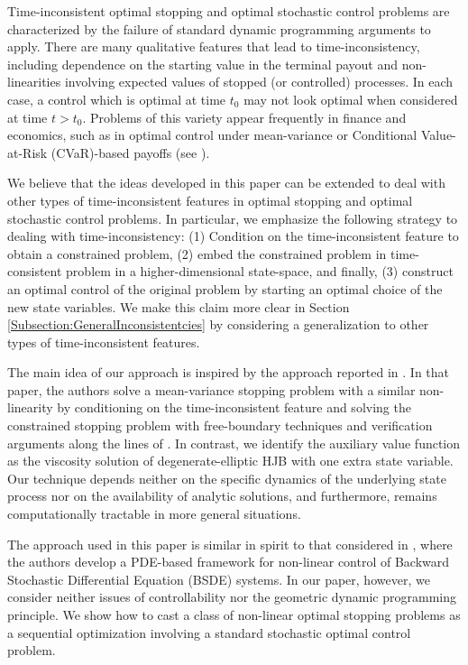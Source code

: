 \documentclass[11pt]{article}
\begin{document}
Time-inconsistent optimal stopping and optimal stochastic control problems are characterized by the failure of standard dynamic programming arguments to apply. There are many qualitative features that lead to time-inconsistency, including dependence on the starting value in the terminal payout and non-linearities involving expected values of stopped (or controlled) processes. In each case, a control which is optimal at time $t_0$ may not look optimal when considered at time $t>t_0$. Problems of this variety appear frequently in finance and economics, such as in optimal control under mean-variance or Conditional Value-at-Risk (CVaR)-based payoffs (see \cite{Bjork2014,PedersenPeskir2013,Yong2012,Rudloff2013}).

We believe that the ideas developed in this paper can be extended to deal with other types of time-inconsistent features in optimal stopping and optimal stochastic control problems. In particular, we emphasize the following strategy to dealing with time-inconsistency: (1) Condition on the time-inconsistent feature to obtain a constrained problem, (2) embed the constrained problem in time-consistent problem in a higher-dimensional state-space, and finally, (3) construct an optimal control of the original problem by starting an optimal choice of the new state variables. We make this claim more clear in Section \ref{Subsection:GeneralInconsistentcies} by considering a generalization to other types of time-inconsistent features.

The main idea of our approach is inspired by the approach reported in \cite{PedersenPeskir2013}. In that paper, the authors solve a mean-variance stopping problem with a similar non-linearity by conditioning on the time-inconsistent feature and solving the constrained stopping problem with free-boundary techniques and verification arguments along the lines of \cite{PeskirShiryaev2006}. In contrast, we identify the auxiliary value function as the viscosity solution of degenerate-elliptic HJB with one extra state variable. Our technique depends neither on the specific dynamics of the underlying state process nor on the availability of analytic solutions, and furthermore, remains computationally tractable in more general situations.

The approach used in this paper is similar in spirit to that considered in \cite{Karnam2015}, where the authors develop a PDE-based framework for non-linear control of Backward Stochastic Differential Equation (BSDE) systems. In our paper, however, we consider neither issues of controllability nor the geometric dynamic programming principle. We show how to cast a class of non-linear optimal stopping problems as a sequential optimization involving a standard stochastic optimal control problem.
\end{document}
